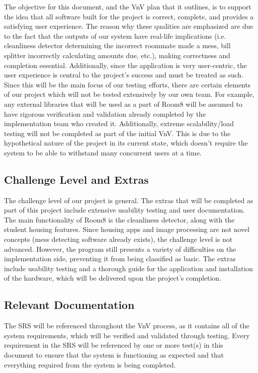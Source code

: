 \documentclass[12pt, titlepage]{article}
\begin{document}
The objective for this document, and the VnV plan that it outlines, is to support the idea that all software built for the project is correct, complete, and provides a satisfying user experience. The reason why these qualities are emphasized are due to the fact that the outputs of our system have real-life implications (i.e. cleanliness detector determining the incorrect roommate made a mess, bill splitter incorrectly calculating amounts due, etc.), making correctness and completion essential. Additionally, since the application is very user-centric, the user experience is central to the project's success and must be treated as such. Since this will be the main focus of our testing efforts, there are certain elements of our project which will not be tested extensively by our own team. For example, any external libraries that will be used as a part of Room8 will be assumed to have rigorous verification and validation already completed by the implementation team who created it. Additionally, extreme scalability/load testing will not be completed as part of the initial VnV. This is due to the hypothetical nature of the project in its current state, which doesn't require the system to be able to withstand many concurrent users at a time. 

\subsection{Challenge Level and Extras}


The challenge level of our project is general. The extras that will be completed as part of this project include extensive usability testing and user documentation. The main functionality of Room8 is the cleanliness detector, along with the student housing features. Since housing apps and image processing are not novel concepts (mess detecting software already exists), the challenge level is not advanced. However, the program still presents a variety of difficulties on the implementation side, preventing it from being classified as basic. The extras include usability testing and a thorough guide for the application and installation of the hardware, which will be delivered upon the project's completion.  

\subsection{Relevant Documentation}
The SRS will be referenced throughout the VnV process, as it contains all of the system requirements, which will be verified and validated through testing. Every requirement in the SRS will be referenced by one or more test(s) in this document to ensure that the system is functioning as expected and that everything required from the system is being completed.
\end{document}

